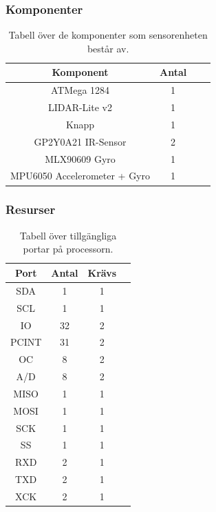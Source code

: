 \documentclass{article}
\begin{document}
\subsubsection{Komponenter}

\begin{table}[H]
  \centering
  \begin{tabular}{ | c | c | c | c |}
    \hline
    \textbf{Komponent} & \textbf{Antal} \\
    \hline
    ATMega 1284 & 1 \\
    \hline
    LIDAR-Lite v2 & 1 \\
    \hline
    Knapp & 1 \\
    \hline
    GP2Y0A21 IR-Sensor & 2 \\
    \hline
    MLX90609 Gyro & 1 \\
    \hline
    MPU6050 Accelerometer + Gyro & 1 \\
    \hline
  \end{tabular}
  \caption{ Tabell över de komponenter som sensorenheten består av. }
\end{table}

\subsubsection{Resurser}

\begin{table}[H]
  \centering
  \begin{tabular}{ | c | c | c | c |}
    \hline
    \textbf{Port} & \textbf{Antal} & \textbf{Krävs} \\
    \hline
    SDA & 1 & 1 \\
    \hline
    SCL & 1 & 1 \\
    \hline
    IO & 32 & 2 \\
    \hline
    PCINT & 31 & 2 \\
    \hline
    OC & 8 & 2 \\
    \hline
    A/D & 8 & 2 \\
    \hline
    MISO & 1 & 1 \\
    \hline
    MOSI & 1 & 1 \\
    \hline
    SCK & 1 & 1 \\
    \hline
    SS & 1 & 1 \\
    \hline
    RXD & 2 & 1 \\
    \hline
    TXD & 2 & 1 \\
    \hline
    XCK & 2 & 1 \\
    \hline
  \end{tabular}
  \caption{Tabell över tillgängliga portar på processorn.}
\end{table}
\end{document}
